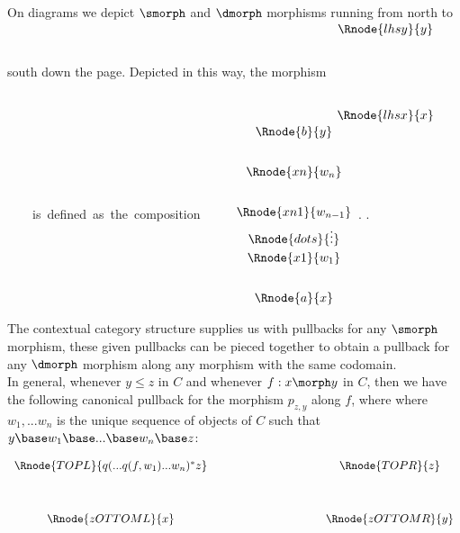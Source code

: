 On diagrams we depict $\smorph$  and $\dmorph$ morphisms running from north to south down the page.
Depicted in this way, the morphism
$
\begin{array} {c}
\Rnode{lhsy}{y} \\[2.0cm]
\Rnode{lhsx}{x}  \\ 
\end{array}
$
 \mbox{\ \ \ \ is defined as the composition\ \ \ \ } 
$
\begin{array}{c}
\Rnode{b}{y}\\[0.7cm]
\Rnode{xn}{w_n}\\[0.7cm]
\Rnode{xn1}{w_{n-1}}\\[0.1cm]
\Rnode{dots}{\vdots}\\[0.1cm]
\Rnode{x1}{w_1}\\[0.7cm]
\Rnode{a}{x} 
\end{array}
$.
.

The contextual category structure supplies us with pullbacks for any $\smorph$ morphism, 
these given pullbacks can be pieced together to obtain a pullback for
any $\dmorph$ morphism  along any morphism with the same codomain. \\

\note
In general, whenever $y \leq z$ in $C$ and whenever $f:x \morph y$ in $C$, then we have
the following canonical pullback for the morphism $p_{z, y}$ along $f$, where
where
$w_1, ... w_n$ is the unique sequence of objects of $C$ such that 
$y \base w_1 \base ... \base w_n \base z$:

\vspace{3mm}
\begin{center}
\begin{equation}
\label{compositepullbackdefinition}
\begin{array}{cp{2.9cm}c}
\Rnode{TOPL}{q(...q(f, w_1)...w_n)^* z} & & \Rnode{TOPR}{z}\\ [1.2cm]
\Rnode{zOTTOML}{x}         & & \Rnode{zOTTOMR}{y}
\end{array}
\end{equation}
\end{center}

